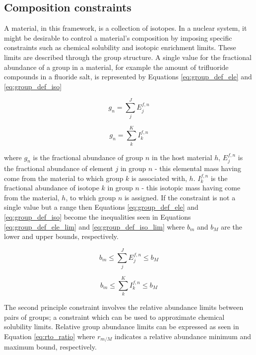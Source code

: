 \subsection{Composition constraints} \label{ssec:group_eq}
A material, in this framework, is a collection of isotopes. In a nuclear 
system, it might be desirable to control a material's  composition by imposing 
specific constraints such as chemical solubility and isotopic enrichment limits.
These limits are described through the group structure. A single value for 
the fractional abundance of a group in
a material, for example the amount of trifluoride compounds in a fluoride 
salt, is represented by Equations
\ref{eq:group_def_ele} and \ref{eq:group_def_iso}

\begin{equation}
\label{eq:group_def_ele}
g_{n} = \sum \limits_{j}^{J} E_{j}^{f,n}
\end{equation} 

\begin{equation}
\label{eq:group_def_iso}
g_{n} = \sum \limits_{k}^{K} I_{k}^{f,n}
\end{equation}

where $g_{n}$ is the fractional abundance of group $n$ 
in the host material $h$, $E_{j}^{f,n}$ is the fractional abundance of element
$j$ in group $n$ - this elemental mass having come from the material to which
group $k$ is associated with, $h$.
$I_{k}^{f,n}$ is the fractional 
abundance of isotope $k$ in group $n$ - this isotopic mass having come from
the material, $h$, to which group $n$ is assigned.
If the constraint is not a single value but a range then 
Equations \ref{eq:group_def_ele} and \ref{eq:group_def_iso} become the 
inequalities seen
in Equations \ref{eq:group_def_ele_lim} and \ref{eq:group_def_iso_lim} where
$b_{m}$ and $b_{M}$ are the lower and upper bounds, respectively.

\begin{equation}
\label{eq:group_def_ele_lim}
b_m \leq \sum \limits_{j}^{J} E_{j}^{f,n} \leq b_{M}
\end{equation} 

\begin{equation}
\label{eq:group_def_iso_lim}
b_{m} \leq \sum \limits_{k}^{K} I_{k}^{f,n} \leq b_{M} 
\end{equation}

The second principle constraint involves the relative abundance limits between 
pairs of groups; a constraint which can be used to approximate chemical 
solubility limits. Relative group abundance limits can be expressed as seen in 
Equation \ref{eq:rto_ratio} where $r_{m/M}$ indicates a relative abundance 
minimum and maximum bound, respectively.

